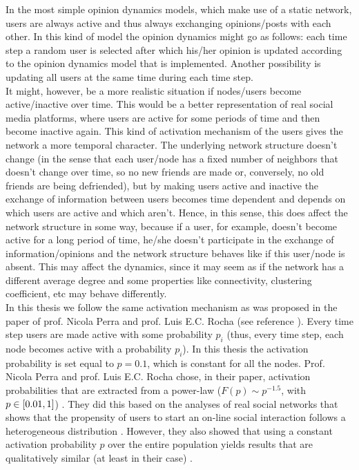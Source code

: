 \documentclass[11 pt , letterpaper , twoside , openright]{book}
\begin{document}
In the most simple opinion dynamics models, which make use of a static network, users are always active and thus always exchanging opinions/posts with each other. In this kind of model the opinion dynamics might go as follows: each time step a random user is selected after which his/her opinion is updated according to the opinion dynamics model that is implemented. Another possibility is updating all users at the same time during each time step. \\
It might, however, be a more realistic situation if nodes/users become active/inactive over time. This would be a better representation of real social media platforms, where users are active for some periods of time and then become inactive again. This kind of activation mechanism of the users gives the network a more temporal character. The underlying network structure doesn't change (in the sense that each user/node has a fixed number of neighbors that doesn't change over time, so no new friends are made or, conversely, no old friends are being defriended), but by making users active and inactive the exchange of information between users becomes time dependent and depends on which users are active and which aren't. Hence, in this sense, this does affect the network structure in some way, because if a user, for example, doesn't become active for a long period of time, he/she doesn't participate in the exchange of information/opinions and the network structure behaves like if this user/node is absent. This may affect the dynamics, since it may seem as if the network has a different average degree and some properties like connectivity, clustering coefficient, etc may behave differently. \\
\newline
In this thesis we follow the same activation mechanism as was proposed in the paper of prof. Nicola Perra and prof. Luis E.C. Rocha (see reference \cite{Perra2019}). Every time step users are made active with some probability $p_i$ (thus, every time step, each node becomes active with a probability $p_i$). In this thesis the activation probability is set equal to $p = 0.1$, which is constant for all the nodes. Prof. Nicola Perra and prof. Luis E.C. Rocha chose, in their paper, activation probabilities that are extracted from a power-law ($F(p) \sim p^{-1.5}$, with $p \in \interval{0.01}{1}$) \cite{Perra2019}. They did this based on the analyses of real social networks that shows that the propensity of users to start an on-line social interaction follows a heterogeneous distribution \cite{Perra2012}\cite{Perra2019}. However, they also showed that using a constant activation probability $p$ over the entire population yields results that are qualitatively similar (at least in their case) \cite{Perra2019}. \\
\end{document}

